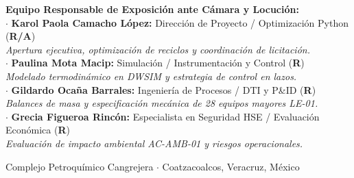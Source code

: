 \documentclass[11pt,letterpaper]{article}
\begin{document}
\begin{center}
    \begin{minipage}{0.92\linewidth}
        \textbf{Equipo Responsable de Exposici\'on ante C\'amara y Locuci\'on:}\\
        $\cdot$ \textbf{Karol Paola Camacho L\'opez:} Direcci\'on de Proyecto / Optimizaci\'on Python (\textbf{R/A})\\
        \hspace*{1.5em}\textit{Apertura ejecutiva, optimizaci\'on de reciclos y coordinaci\'on de licitaci\'on.}\\
        $\cdot$ \textbf{Paulina Mota Macip:} Simulaci\'on / Instrumentaci\'on y Control (\textbf{R})\\
        \hspace*{1.5em}\textit{Modelado termodin\'amico en DWSIM y estrategia de control en lazos.}\\
        $\cdot$ \textbf{Gildardo Oca\~na Barrales:} Ingenier\'ia de Procesos / DTI y P\&ID (\textbf{R})\\
        \hspace*{1.5em}\textit{Balances de masa y especificaci\'on mec\'anica de 28 equipos mayores LE-01.}\\
        $\cdot$ \textbf{Grecia Figueroa Rinc\'on:} Especialista en Seguridad HSE / Evaluaci\'on Econ\'omica (\textbf{R})\\
        \hspace*{1.5em}\textit{Evaluaci\'on de impacto ambiental AC-AMB-01 y riesgos operacionales.}
    \end{minipage}
    \vfill
    {\small Complejo Petroqu\'imico Cangrejera $\cdot$ Coatzacoalcos, Veracruz, M\'exico}
\end{center}
\end{document}
